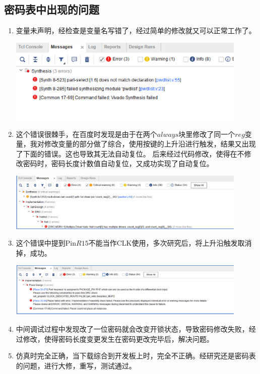 \documentclass[a4paper,11pt]{ctexart}
\begin{document}
\subsection{密码表中出现的问题}
\begin{enumerate}
  \item 变量未声明，经检查是变量名写错了，经过简单的修改就又可以正常工作了。

        \includegraphics[width=0.9\textwidth]{./images/error0.eps}
  \item 这个错误很棘手，在百度时发现是由于在两个$always$块里修改了同一个$reg$变量，我对修改变量的部分做了综合，使用按键的上升沿进行触发，结果又出现了下面的错误。这也导致其无法自动复位。
        后来经过代码修改，使得在不修改密码时，密码长度计数值自动复位，又成功实现了自动复位。

        \includegraphics[width=0.9\textwidth]{./images/error4.eps}
  \item 这个错误中提到Pin$R15$不能当作CLK使用，多次研究后，将上升沿触发取消掉，成功。

        \includegraphics[width=0.9\textwidth]{./images/error5.eps}

  \item 中间调试过程中发现改了一位密码就会改变开锁状态，导致密码修改失败，经过修改，使得密码长度变更发生在密码更改完毕后，解决问题。
  
  \item 仿真时完全正确，当下载综合到开发板上时，完全不正确。经研究还是密码表的问题，进行大修，重写，测试通过。
\end{enumerate}
\end{document}
